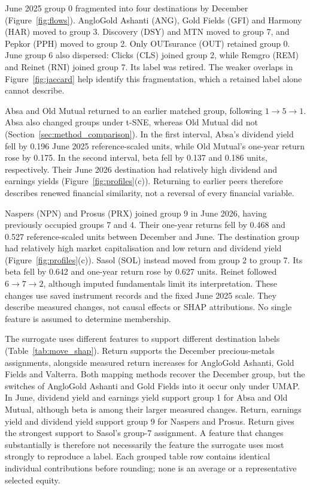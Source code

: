 June 2025 group 0 fragmented into four destinations by December (Figure~\ref{fig:flows}). AngloGold Ashanti (ANG), Gold Fields (GFI) and Harmony (HAR) moved to group 3. Discovery (DSY) and MTN moved to group 7, and Pepkor (PPH) moved to group 2. Only OUTsurance (OUT) retained group 0. June group 6 also dispersed: Clicks (CLS) joined group 2, while Remgro (REM) and Reinet (RNI) joined group 7. Its label was retired. The weaker overlaps in Figure~\ref{fig:jaccard} help identify this fragmentation, which a retained label alone cannot describe.

Absa and Old Mutual returned to an earlier matched group, following $1\rightarrow5\rightarrow1$. Absa also changed groups under t-SNE, whereas Old Mutual did not (Section~\ref{sec:method_comparison}). In the first interval, Absa's dividend yield fell by 0.196 June 2025 reference-scaled units, while Old Mutual's one-year return rose by 0.175. In the second interval, beta fell by 0.137 and 0.186 units, respectively. Their June 2026 destination had relatively high dividend and earnings yields (Figure~\ref{fig:profiles}(c)). Returning to earlier peers therefore describes renewed financial similarity, not a reversal of every financial variable.

Naspers (NPN) and Prosus (PRX) joined group 9 in June 2026, having previously occupied groups 7 and 4. Their one-year returns fell by 0.468 and 0.527 reference-scaled units between December and June. The destination group had relatively high market capitalisation and low return and dividend yield (Figure~\ref{fig:profiles}(c)). Sasol (SOL) instead moved from group 2 to group 7. Its beta fell by 0.642 and one-year return rose by 0.627 units. Reinet followed $6\rightarrow7\rightarrow2$, although imputed fundamentals limit its interpretation. These changes use saved instrument records and the fixed June 2025 scale. They describe measured changes, not causal effects or SHAP attributions. No single feature is assumed to determine membership.

The surrogate uses different features to support different destination labels (Table~\ref{tab:move_shap}). Return supports the December precious-metals assignments, alongside measured return increases for AngloGold Ashanti, Gold Fields and Valterra. Both mapping methods recover the December group, but the switches of AngloGold Ashanti and Gold Fields into it occur only under UMAP. In June, dividend yield and earnings yield support group 1 for Absa and Old Mutual, although beta is among their larger measured changes. Return, earnings yield and dividend yield support group 9 for Naspers and Prosus. Return gives the strongest support to Sasol's group-7 assignment. A feature that changes substantially is therefore not necessarily the feature the surrogate uses most strongly to reproduce a label. Each grouped table row contains identical individual contributions before rounding; none is an average or a representative selected equity.

